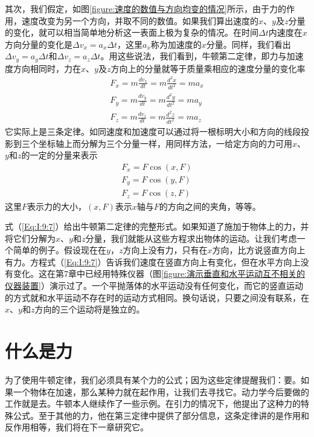 其次，我们假定，如图\ref{figure:速度的数值与方向均变的情况}所示，由于力的作用，速度改变为另一个方向，并取不同的数值。如果我们算出速度的$x$、$y$及$z$分量的变化，就可以相当简单地分析这一表面上极为复杂的情况。在时间$\Delta t$内速度在$x$方向分量的变化是$\Delta v_x=a_x \Delta t$，这里$a_x$称为加速度的$x$分量。同样，我们看出$\Delta v_y=a_y \Delta t$和$\Delta v_z=a_z \Delta t$。用这些说法，我们看到，牛顿第二定律，即力与加速度方向相同时，力在$x$、$y$及$z$方向上的分量就等于质量乘相应的速度分量的变化率
\begin{equation}
    \label{Eq:I:9:7}
    \begin{split}
        F_x=m\frac{dv_x}{dt}=m\frac{d^2x}{dt^2}=ma_x \\
        F_y=m\frac{dv_y}{dt}=m\frac{d^2y}{dt^2}=ma_y \\
        F_z=m\frac{dv_z}{dt}=m\frac{d^2z}{dt^2}=ma_z
    \end{split}
\end{equation}
它实际上是三条定律。如同速度和加速度可以通过将一根标明大小和方向的线段投影到三个坐标轴上而分解为三个分量一样，用同样方法，一给定方向的力可用$x$、$y$和$z$的一定的分量来表示
\begin{equation}
    \label{Eq:I:9:8}
    \begin{split}
        F_x=F\cos(x,F) \\
        F_y=F\cos(y,F) \\
        F_z=F\cos(z,F)
    \end{split}
\end{equation}
这里$F$表示力的大小，$(x,F)$表示$x$轴与$F$的方向之间的夹角，等等。

式（\ref{Eq:I:9:7}）给出牛顿第二定律的完整形式。如果知道了施加于物体上的力，并将它们分解为$x$、$y$和$z$分量，我们就能从这些方程求出物体的运动。让我们考虑一个简单的例子。假设现在在$y$，$z$方向上没有力，只有在$x$方向，比方说竖直方向上有力。方程式（\ref{Eq:I:9:7}）告诉我们速度在竖直方向上有变化，但在水平方向上没有变化。这在第7章中已经用特殊仪器（图\ref{figure:演示垂直和水平运动互不相关的仪器装置}）演示过了。一个平抛落体的水平运动没有任何变化，而它的竖直运动的方式就和水平运动不存在时的运动方式相同。换句话说，只要之间没有联系，在$x$、$y$和$z$方向的三个运动将是独立的。

\section{什么是力}

为了使用牛顿定律，我们必须具有某个力的公式；因为这些定律提醒我们：要。如果一个物体在加速，那么某种力就在起作用，让我们去寻找它。动力学今后要做的工作就是去。牛顿本人继续作了一些示例。在引力的情况下，他提出了这种力的特殊公式。至于其他的力，他在第三定律中提供了部分信息，这条定律讲的是作用和反作用相等，我们将在下一章研究它。

